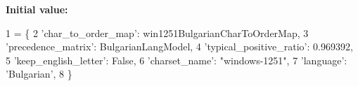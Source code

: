 {\bfseries Initial value\+:}
\begin{DoxyCode}
1 =  \{
2   \textcolor{stringliteral}{'char\_to\_order\_map'}: win1251BulgarianCharToOrderMap,
3   \textcolor{stringliteral}{'precedence\_matrix'}: BulgarianLangModel,
4   \textcolor{stringliteral}{'typical\_positive\_ratio'}: 0.969392,
5   \textcolor{stringliteral}{'keep\_english\_letter'}: \textcolor{keyword}{False},
6   \textcolor{stringliteral}{'charset\_name'}: \textcolor{stringliteral}{"windows-1251"},
7   \textcolor{stringliteral}{'language'}: \textcolor{stringliteral}{'Bulgarian'},
8 \}
\end{DoxyCode}
